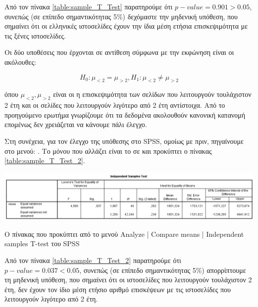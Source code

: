 \documentclass{assignment}
\begin{document}
\begin{Assignment}[Μέρος Β]
Από τον πίνακα \ref{table:sample_T_Test} παρατηρούμε ότι $p-value = 0.901 > 0.05$, συνεπώς (σε επίπεδο σημαντικότητας 5\%) δεχόμαστε την μηδενική υπόθεση, που σημαίνει ότι οι ελληνικές ιστοσελίδες έχουν την ίδια μέση ετήσια επισκεψιμότητα με τις ξένες ιστοσελίδες.


Οι δύο υποθέσεις που έρχονται σε αντίθεση σύμφωνα με την εκφώνηση είναι οι ακόλουθες:

\begin{equation}
H_0 : \mu_{<2} = \mu_{>2}, H_1: \mu_{<2} \neq \mu_{>2}
\end{equation}

όπου $ \mu_{<2}, \mu_{>2} $ είναι οι η επισκεψιμότητα των σελίδων που λειτουργούν τουλάχιστον 2 έτη και οι σελίδες που λειτουργούν λιγότερο από 2 έτη αντίστοιχα. Από το προηγούμενο ερωτήμα γνωρίζουμε ότι τα δεδομένα ακολουθούν κανονική κατανομή επομένως δεν χρειάζεται να κάνουμε πάλι έλεγχο.

Στη συνέχεια, για τον έλεγχο της υπόθεσης στο SPSS, ομοίως με πριν, πηγαίνουμε στο μενού: . Το μόνου που αλλάζει είναι το  σε  και προκύπτει ο πίνακας \ref{table:sample_T_Test_2}. 

\begin{table}[htbp]
\includegraphics[width=\textwidth]{images/table_independent_Sample_T_Test_2.png}
\caption{Ο πίνακας που προκύπτει από το μενού Analyze | Compare means | Independent samples T-test του SPSS}
\label{table:sample_T_Test_2}
\end{table}

Από τον πίνακα \ref{table:sample_T_Test_2} παρατηρούμε ότι $p-value = 0.037 < 0.05$, συνεπώς (σε επίπεδο σημαντικότητας 5\%) απορρίπτουμε τη μηδενική υπόθεση, που σημαίνει ότι οι ιστοσελίδες που λειτουργούν τουλάχιστον 2 έτη, δεν έχουν τον ίδιο μέση ετήσιο αριθμό επισκέψεων με τις ιστοσελίδες που λειτουργούν λιγότερο από 2 έτη.



\end{Assignment}
\end{document}
